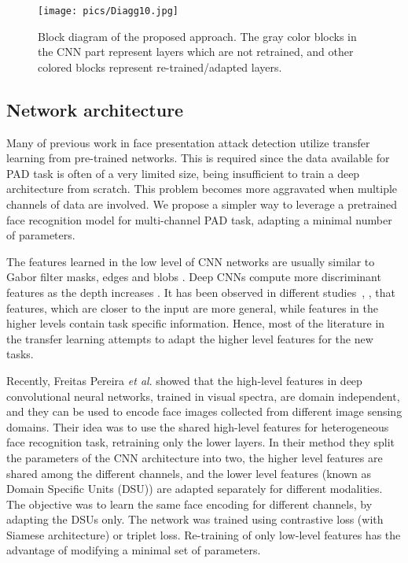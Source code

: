 \documentclass[journal]{IEEEtran}
\begin{document}
\begin{figure*}[t]
\centering
\texttt{[image: pics/Diagg10.jpg]}
\caption{Block diagram of the proposed approach. The gray color blocks in the CNN part represent layers which are not retrained, and other colored blocks represent re-trained/adapted layers. }
\label{fig:mcnn_general_block}
\end{figure*}


\subsection{Network architecture}

Many of previous work in face presentation attack detection utilize transfer learning from pre-trained networks. This is required since the data available for PAD task is often of a very limited size, being insufficient to train a deep architecture from scratch. This problem becomes more aggravated when multiple channels of data are involved. We propose a simpler way to leverage a pretrained face recognition model for multi-channel PAD task, adapting a minimal number of parameters. 

The features learned in the low level of CNN networks are usually similar to Gabor filter masks, edges and blobs \cite{yosinski2014transferable}.
Deep CNNs compute more discriminant features as the depth increases \cite{mallat2016understanding}. It has been observed in different studies~\cite{yosinski2014transferable}, \cite{li2015lcnn}, that features, which are closer to the input are more general, while features in the higher levels contain task specific information. Hence, most of the literature in the transfer learning attempts to adapt the higher level features for the new tasks.

Recently, Freitas Pereira \textit{et al}. \cite{freitas2018heterogeneous} showed that the high-level features in deep convolutional
neural networks, trained in visual spectra, are domain independent, and they can be used to encode face images collected from different
image sensing domains. Their idea was to use the shared high-level features for heterogeneous face recognition task, retraining
only the lower layers. In their method they split the parameters of the CNN architecture into two, the higher level features are shared among the different channels, and the lower level features  (known as Domain Specific Units (DSU)) are adapted separately for different modalities. The objective was to learn the same face encoding for different channels, by adapting the DSUs only. The network was trained using contrastive loss (with Siamese architecture) or triplet loss. Re-training of only low-level features has the advantage of modifying a minimal set of parameters.
\end{document}
